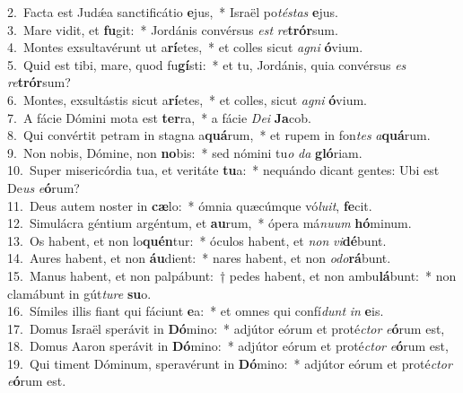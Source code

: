 {2.~}Facta est Judǽa sanctificátio \textbf{e}jus,~* Israël po\textit{té}\textit{stas} \textbf{e}jus.\\
{3.~}Mare vidit, et \textbf{fu}git:~* Jordánis convérsus \textit{est} \textit{re}\textbf{trór}sum.\\
{4.~}Montes exsultavérunt ut a\textbf{rí}etes,~* et colles sicut \textit{a}\textit{gni} \textbf{ó}vium.\\
{5.~}Quid est tibi, mare, quod fu\textbf{gí}sti:~* et tu, Jordánis, quia convérsus \textit{es} \textit{re}\textbf{trór}sum?\\
{6.~}Montes, exsultástis sicut a\textbf{rí}etes,~* et colles, sicut \textit{a}\textit{gni} \textbf{ó}vium.\\
{7.~}A fácie Dómini mota est \textbf{ter}ra,~* a fácie \textit{De}\textit{i} \textbf{Ja}cob.\\
{8.~}Qui convértit petram in stagna a\textbf{quá}rum,~* et rupem in fon\textit{tes} \textit{a}\textbf{quá}rum.\\
{9.~}Non nobis, Dómine, non \textbf{no}bis:~* sed nómini tu\textit{o} \textit{da} \textbf{gló}riam.\\
{10.~}Super misericórdia tua, et veritáte \textbf{tu}a:~* nequándo dicant gentes: Ubi est De\textit{us} \textit{e}\textbf{ó}rum?\\
{11.~}Deus autem noster in \textbf{cæ}lo:~* ómnia quæcúmque vó\textit{lu}\textit{it}, \textbf{fe}cit.\\
{12.~}Simulácra géntium argéntum, et \textbf{au}rum,~* ópera má\textit{nu}\textit{um} \textbf{hó}minum.\\
{13.~}Os habent, et non lo\textbf{quén}tur:~* óculos habent, et \textit{non} \textit{vi}\textbf{dé}bunt.\\
{14.~}Aures habent, et non \textbf{áu}dient:~* nares habent, et non \textit{o}\textit{do}\textbf{rá}bunt.\\
{15.~}Manus habent, et non palpábunt:~† pedes habent, et non ambu\textbf{lá}bunt:~* non clamábunt in gút\textit{tu}\textit{re} \textbf{su}o.\\
{16.~}Símiles illis fiant qui fáciunt \textbf{e}a:~* et omnes qui confí\textit{dunt} \textit{in} \textbf{e}is.\\
{17.~}Domus Israël sperávit in \textbf{Dó}mino:~* adjútor eórum et proté\textit{ctor} \textit{e}\textbf{ó}rum est,\\
{18.~}Domus Aaron sperávit in \textbf{Dó}mino:~* adjútor eórum et proté\textit{ctor} \textit{e}\textbf{ó}rum est,\\
{19.~}Qui timent Dóminum, speravérunt in \textbf{Dó}mino:~* adjútor eórum et proté\textit{ctor} \textit{e}\textbf{ó}rum est.\\

